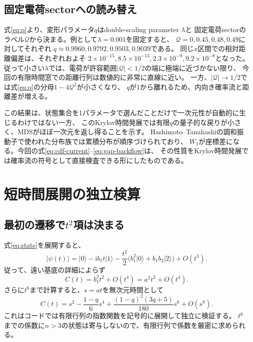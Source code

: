 \documentclass[a4paper,11pt]{ltjsarticle}
\numberwithin{equation}{section}
\newcommand{\ket}[1]{\lvert #1\rangle}
\newcommand{\ii}{\mathrm{i}}
\begin{document}
\subsection{固定電荷sectorへの読み替え}
式\eqref{eq:q}より、変形パラメータ$q$はdouble-scaling parameter $\lambda$と
固定電荷sectorのラベル$\mathcal Q$から決まる。例として$\lambda=0.001$を固定すると、
$\mathcal Q=0,0.45,0.48,0.49$に対してそれぞれ
$q\simeq0.9960,0.9792,0.9503,0.9039$である。
同じ$x$区間での相対距離偏差は、それぞれおよそ
$2\times10^{-15},8.5\times10^{-13},2.3\times10^{-9},9.2\times10^{-8}$となった。
従って小さい$\lambda$では、電荷が許容範囲$|\mathcal Q|<1/2$の端に極端に近づかない限り、
今回の有限時間窓での距離行列は数値的に非常に直線に近い。
一方、$|\mathcal Q|\to1/2$では式\eqref{eq:q}の分母$1-4\mathcal Q^2$が小さくなり、
$q$が1から離れるため、内向き確率流と距離差が増える。

この結果は、状態集合を1パラメータで選んだことだけで一次元性が自動的に生じるわけではない一方、
このKrylov時間発展では有限$q$の量子的な戻りが小さく、MDSがほぼ一次元を返し得ることを示す。
Hashimoto--Tanahashiの調和振動子で使われた分布族では累積分布が順序づけられており、
$W_1$が座標差になる。今回の式\eqref{eq:cdf-current}--\eqref{eq:gap-backflow}は、
その性質をKrylov時間発展では確率流の符号として直接検査できる形にしたものである。

\section{短時間展開の独立検算}
\subsection{最初の遷移で$t^2$項は決まる}
式\eqref{eq:state}を展開すると、
\begin{equation}
 \ket{\psi(t)}=\ket0-\ii b_1t\ket1
 -\frac{t^2}{2}\bigl(b_1^2\ket0+b_1b_2\ket2\bigr)+O(t^3).
 \label{eq:shortstate}
\end{equation}
従って、遠い基底の詳細によらず
\begin{equation}
 C(t)=b_1^2t^2+O(t^4)=a^2t^2+O(t^4).
 \label{eq:shortc}
\end{equation}
さらに$t^6$まで計算すると、$s=at$を無次元時間として
\begin{equation}
 C(t)=s^2-\frac{1-q}{6}s^4
 +\frac{(1-q)^2(3q+5)}{180}s^6+O(s^8).
 \label{eq:series}
\end{equation}
これはコードでは有限行列の指数関数を記号的に展開して独立に検証する。
$t^6$までの係数に$n>3$の状態は寄与しないので、有限行列で係数を厳密に求められる。
\end{document}
